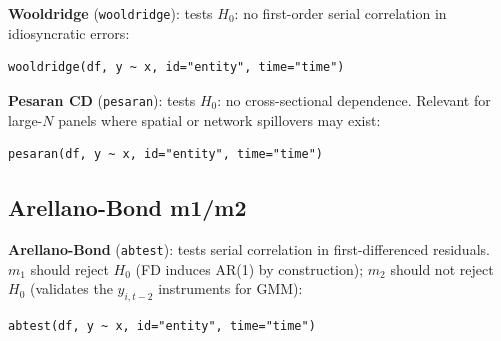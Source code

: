 \textbf{Wooldridge} (\texttt{wooldridge}): tests $H_0$: no first-order
serial correlation in idiosyncratic errors:

\begin{lstlisting}
wooldridge(df, y ~ x, id="entity", time="time")
\end{lstlisting}

\textbf{Pesaran CD} (\texttt{pesaran}): tests $H_0$: no cross-sectional
dependence. Relevant for large-$N$ panels where spatial or network spillovers
may exist:

\begin{lstlisting}
pesaran(df, y ~ x, id="entity", time="time")
\end{lstlisting}

\subsection{Arellano-Bond m1/m2}

\textbf{Arellano-Bond} (\texttt{abtest}): tests serial correlation in
first-differenced residuals. $m_1$ should reject $H_0$ (FD induces AR(1) by
construction); $m_2$ should not reject $H_0$ (validates the $y_{i,t-2}$
instruments for GMM):

\begin{lstlisting}
abtest(df, y ~ x, id="entity", time="time")
\end{lstlisting}
